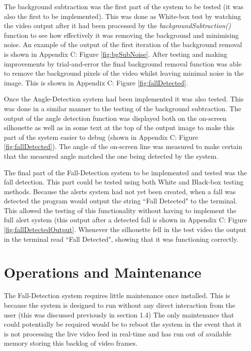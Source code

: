 \documentclass[11pt,a4paper]{report}
\begin{document}
The background subtraction was the first part of the system to be tested (it was also the first to be implemented). This was done as White-box test by watching the video output after it had been processed by the \textit{backgroundSubtraction()} function to see how effectively it was removing the background and minimising noise. An example of the output of the first iteration of the background removal is shown in Appendix C: Figure \ref{fig:bgSubNoise}. After testing and making improvements by trial-and-error the final background removal function was able to remove the background pixels of the video whilst leaving minimal noise in the image. This is shown in Appendix C: Figure \ref{fig:fallDetected}.

Once the Angle-Detection system had been implemented it was also tested. This was done in a similar manner to the testing of the background subtraction. The output of the angle detection function was displayed both on the on-screen silhouette as well as in some text at the top of the output image to make this part of the system easier to debug (shown in Appendix C: Figure \ref{fig:fallDetected}). The angle of the on-screen line was measured to make certain that the measured angle matched the one being detected by the system.

The final part of the Fall-Detection system to be implemented and tested was the fall detection. This part could be tested using both White and Black-box testing methods. Because the alerts system had not yet been created, when a fall was detected the program would output the string ``Fall Detected" to the terminal. This allowed the testing of this functionality without having to implement the full alert system (this output after a detected fall is shown in Appendix C: Figure \ref{fig:fallDetectedOutput}. Whenever the silhouette fell in the test video the output in the terminal read ``Fall Detected", showing that it was functioning correctly.

\pagebreak
\section{Operations and Maintenance}

The Fall-Detection system requires little maintenance once installed. This is because the system is designed to run without any direct interaction from the user (this was discussed previously in section 1.4) The only maintenance that could potentially be required would be to reboot the system in the event that it is not processing the live video feed in real-time and has run out of available memory storing this backlog of video frames.
\end{document}

